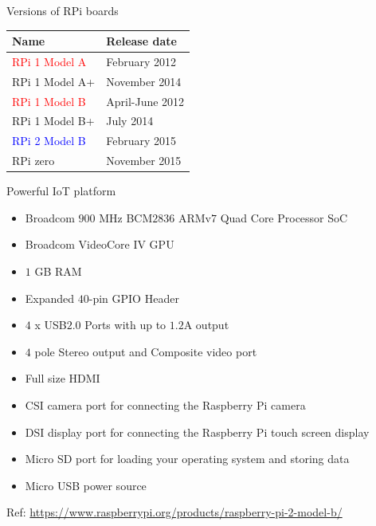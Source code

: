 \begin{frame}{Versions of RPi boards}
	\begin{table}
		\centering
		\begin{tabular}{|l|l|}
			\hline
			\textbf{Name} & \textbf{Release date} \\ \hline
			\textcolor{red}{RPi 1 Model A} & February 2012 \\ \hline
			RPi 1 Model A+ & November 2014 \\ \hline
			\textcolor{red}{RPi 1 Model B} & April-June 2012 \\ \hline
			RPi 1 Model B+ & July 2014 \\ \hline
			\textcolor{blue}{RPi 2 Model B} & February 2015 \\ \hline
			RPi zero & November 2015 \\ \hline
		\end{tabular}
	\end{table}
\end{frame}

\begin{frame}{Powerful IoT platform}
	\begin{itemize}
		\item Broadcom $900$ MHz BCM$2836$ ARMv$7$ Quad Core Processor SoC 
		\item Broadcom VideoCore IV GPU
		\item $1$ GB RAM
		\item Expanded $40$-pin GPIO Header
		\item $4$ x USB$2.0$ Ports with up to $1.2$A output
		\item $4$ pole Stereo output and Composite video port
		\item Full size HDMI
		\item CSI camera port for connecting the Raspberry Pi camera
		\item DSI display port for connecting the Raspberry Pi touch screen display
		\item Micro SD port for loading your operating system and storing data
		\item Micro USB power source
	\end{itemize}
	Ref: \url{https://www.raspberrypi.org/products/raspberry-pi-2-model-b/}
\end{frame}


